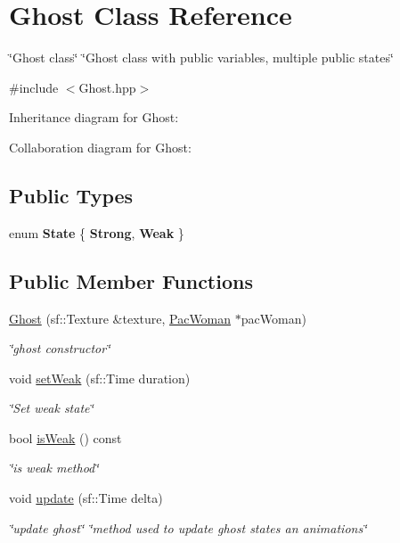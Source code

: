 \hypertarget{classGhost}{}\section{Ghost Class Reference}
\label{classGhost}


\char`\"{}\+Ghost class\char`\"{}  \char`\"{}\+Ghost class with public variables, multiple public states\char`\"{}  




{\ttfamily \#include $<$Ghost.\+hpp$>$}



Inheritance diagram for Ghost\+:


Collaboration diagram for Ghost\+:
\subsection*{Public Types}
\begin{DoxyCompactItemize}
\item 
\mbox{\label{classGhost_af712fc09f900832a0225928c4556234d}} 
enum {\bfseries State} \{ {\bfseries Strong}, 
{\bfseries Weak}
 \}
\end{DoxyCompactItemize}
\subsection*{Public Member Functions}
\begin{DoxyCompactItemize}
\item 
\hyperlink{classGhost_ac56823314f8c39fc178a59982ad48d8a}{Ghost} (sf\+::\+Texture \&texture, \hyperlink{classPacWoman}{Pac\+Woman} $\ast$pac\+Woman)
\begin{DoxyCompactList}\small\item\em \char`\"{}ghost constructor\char`\"{} \end{DoxyCompactList}\item 
void \hyperlink{classGhost_a4f563124a7b39bc1fea2553430e76c24}{set\+Weak} (sf\+::\+Time duration)
\begin{DoxyCompactList}\small\item\em \char`\"{}\+Set weak state\char`\"{} \end{DoxyCompactList}\item 
bool \hyperlink{classGhost_af0cf8b5a66a4a390746f43238b96fe55}{is\+Weak} () const
\begin{DoxyCompactList}\small\item\em \char`\"{}is weak method\char`\"{} \end{DoxyCompactList}\item 
\mbox{\label{classGhost_a0ac45a3d870db2f286645e909e868738}} 
void \hyperlink{classGhost_a0ac45a3d870db2f286645e909e868738}{update} (sf\+::\+Time delta)
\begin{DoxyCompactList}\small\item\em \char`\"{}update ghost\char`\"{}  \char`\"{}method used to update ghost states an animations\char`\"{} \end{DoxyCompactList}\end{DoxyCompactItemize}
